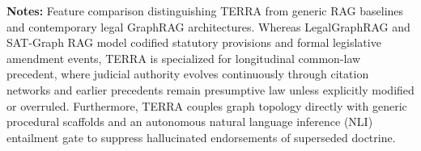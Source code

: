\vspace{1mm}
\raggedright \footnotesize \textbf{Notes:} Feature comparison distinguishing TERRA from generic RAG baselines and contemporary legal GraphRAG architectures. Whereas LegalGraphRAG \cite{chen2026legalgraphrag} and SAT-Graph RAG \cite{demartim2025satgraphrag} model codified statutory provisions and formal legislative amendment events, TERRA is specialized for longitudinal common-law precedent, where judicial authority evolves continuously through citation networks and earlier precedents remain presumptive law unless explicitly modified or overruled. Furthermore, TERRA couples graph topology directly with generic procedural scaffolds and an autonomous natural language inference (NLI) entailment gate to suppress hallucinated endorsements of superseded doctrine.
\par\endgroup
